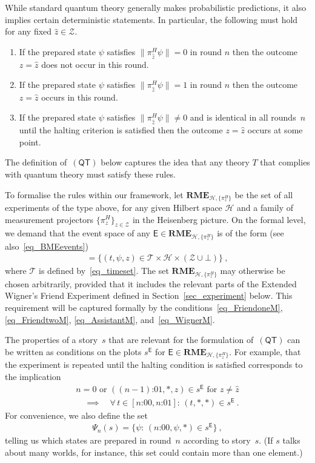 \documentclass{article}
\theoremstyle{plain}
\theoremstyle{definition}
\newcommand*{\cH}{\mathcal{H}}
\newcommand*{\cT}{\mathcal{T}}
\newcommand*{\cZ}{\mathcal{Z}}
\newcommand*{\Exp}{\mathsf{E}}
\newcommand*{\RME}{\mathbf{RME}}
\newcommand*{\QT}{\mathsf{(QT)}}
\begin{document}
While standard quantum theory generally makes probabilistic predictions, it also implies certain deterministic statements. In particular, the following must hold for any fixed $\hat{z} \in \cZ$.
\begin{enumerate}[label=(\emph{\alph*})]
  \item If the prepared state $\psi$ satisfies $\|\pi^H_{\hat{z}} \psi\| = 0$ in round $n$ then the outcome $z = \hat{z}$ does not occur in this round.
    \item If the prepared state $\psi$ satisfies $\|\pi^H_{\hat{z}} \psi\| = 1$ in round $n$ then the outcome $z = \hat{z}$ occurs in this round.
  \item If the prepared state $\psi$ satisfies $\|\pi^H_{\hat{z}} \psi \| \neq 0$ and is identical in all rounds~$n$ until the halting criterion is satisfied then the outcome $z = \hat{z}$ occurs at some point.
  \end{enumerate}
The definition of~$\QT$ below captures the idea that any theory $T$ that complies with quantum theory must satisfy these rules. 

To formalise the rules within our framework, let $\RME_{\cH, \{\pi^H_z\}}$ be the set of all experiments of the type above, for any given Hilbert space $\cH$ and a family of measurement projectors $\{\pi^H_z\}_{z \in \cZ}$ in the Heisenberg picture. On the formal level, we demand that the event space of any $\Exp \in \RME_{\cH, \{\pi^H_z\}}$ is of the form (see also~\eqref{eq_BMEevents})
\begin{align*} 
    [\Exp] = \bigl\{ (t, \psi, z) \in \cT \times \cH \times (\cZ \cup {\bot})      \bigr\}  \ ,
\end{align*}
where $\cT$ is defined by~\eqref{eq_timeset}. The set $\RME_{\cH, \{\pi^H_z\}}$  may otherwise be chosen arbitrarily, provided that it includes the relevant parts of the Extended Wigner's Friend Experiment defined in Section~\ref{sec_experiment} below. This requirement will be captured formally by the conditions~\eqref{eq_FriendoneM}, \eqref{eq_FriendtwoM}, \eqref{eq_AssistantM}, and~\eqref{eq_WignerM}. 

The properties of a story~$s$ that are relevant for the formulation of~$\QT$ can be written as conditions on the plots $s^{\Exp}$ for $\Exp \in \RME_{\cH, \{\pi^H_z\}}$. For example,  that the experiment is repeated until the halting condition is satisfied corresponds to the implication
\begin{multline} \label{eq_untilhalt}
  n=0 \text{ or } (\text{$(n-1)$:01}, *, z) \in s^{\Exp} \text{ for $z \neq \hat{z}$} \\
  \quad \implies \quad \forall \, t \in [\text{$n$:00}, \text{$n$:01}] :\, (t, *, *) \in s^{\Exp} \ .
\end{multline}
For convenience, we also define the set  
\begin{align*}
  \Psi_n(s) = \{ \psi : \, (\text{$n$:00}, \psi, *) \in s^{\Exp} \} \ ,
\end{align*}
telling us which states are prepared in round~$n$ according to story~$s$. (If $s$ talks about many worlds, for instance, this set could contain more than one element.)
\end{document}
